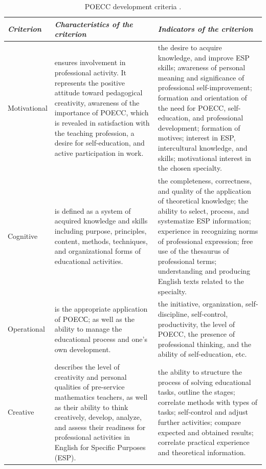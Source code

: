 \begin{table}[!htpb]
\centering
\caption{POECC development criteria \cite{dmitrenko2020autonomous}.}
\label{tab-01}
\begin{threeparttable}
\begin{tabular}{l p{5cm} p{7cm}} 
\toprule
\emph{Criterion} & \emph{Characteristics of the criterion} & \emph{Indicators of the criterion} \\
\midrule
Motivational & ensures involvement in professional activity. It represents the positive attitude toward pedagogical creativity, awareness of the importance of POECC, which is revealed in satisfaction with the teaching profession, a desire for self-education, and active participation in work. & the desire to acquire knowledge, and improve	ESP skills; awareness of personal meaning and significance of	professional self-improvement; formation and orientation of the need for	POECC, self-education, and professional development; formation of motives; interest in ESP, intercultural knowledge, and skills; motivational interest in the chosen specialty. \\

Cognitive & is defined as a system of acquired knowledge and skills including purpose, principles, content, methods, techniques, and organizational forms of educational activities. & the completeness, correctness, and quality of the application of theoretical knowledge; the ability to select, process, and systematize ESP information; experience in recognizing norms of professional expression; free use of the thesaurus of professional terms; understanding and producing English texts related to the specialty. \\

Operational & is the appropriate application of POECС; as well as the ability to manage the educational process and one's own development. & the initiative, organization, self-discipline, self-control, productivity, the level of POECC, the presence of professional thinking, and the ability of self-education, etc. \\

Creative & describes the level of creativity and personal qualities of pre-service mathematics teachers, as well as their ability to think creatively, develop, analyze, and assess their readiness for professional activities in English for Specific Purposes (ESP). & the	ability to structure the process of solving educational tasks, outline the stages; correlate methods with types of tasks; self-control and adjust further activities; compare expected and obtained results; correlate practical experience and theoretical information. \\
\bottomrule
\end{tabular}
\end{threeparttable}
\end{table}

